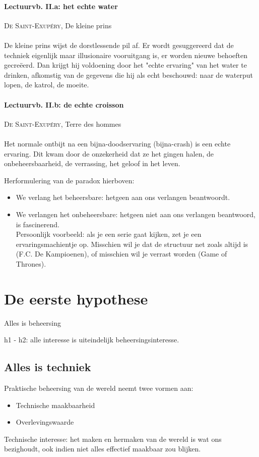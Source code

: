 \documentclass[11pt,a4paper]{article}
\begin{document}
\paragraph{Lectuurvb. II.a: het echte water} \textsc{De Saint-Exup\'ery}, De kleine prins
\\ \\
De kleine prins wijst de dorstlessende pil af. Er wordt gesuggereerd dat de techniek eigenlijk maar illusionaire vooruitgang is, er worden nieuwe behoeften gecre\"eerd. Dan krijgt hij voldoening door het "echte ervaring" van het water te drinken, afkomstig van de gegevens die hij als echt beschouwd: naar de waterput lopen, de katrol, de moeite.

\paragraph{Lectuurvb. II.b: de echte croisson} \textsc{De Saint-Exup\'ery}, Terre des hommes
\\ \\
Het normale ontbijt na een bijna-doodservaring (bijna-crash) is een echte ervaring. Dit kwam door de onzekerheid dat ze het gingen halen, de onbeheersbaarheid, de verrassing, het geloof in het leven.

Herformulering van de paradox hierboven:

\begin{itemize}
	\item We verlang het beheersbare: hetgeen aan ons verlangen beantwoordt. 
	\item We verlangen het onbeheersbare: hetgeen niet aan ons verlangen beantwoord, is fascinerend.
	\\ Persoonlijk voorbeeld: als je een serie gaat kijken, zet je een ervaringsmachientje op. Misschien wil je dat de structuur net zoals altijd is (F.C. De Kampioenen), of misschien wil je verrast worden (Game of Thrones).
\end{itemize}

\section{De eerste hypothese}
\begin{center}
\begin{huge}
Alles is beheersing
\end{huge}
\end{center}
h1 - h2: alle interesse is uiteindelijk beheersingsinteresse.

\subsection{Alles is techniek}
Praktische beheersing van de wereld neemt twee vormen aan:
\begin{itemize}
\item Technische maakbaarheid
\item Overlevingswaarde
\end{itemize}
Technische interesse: het maken en hermaken van de wereld is wat ons bezighoudt, ook indien niet alles effectief maakbaar zou blijken.
\end{document}
